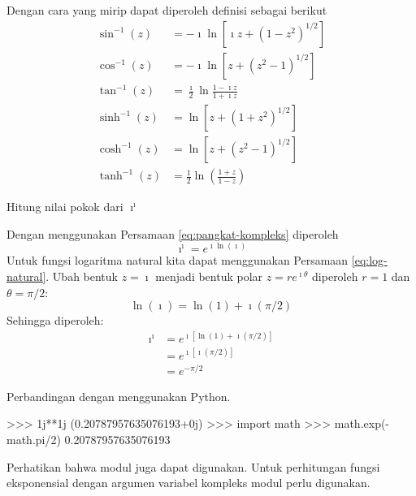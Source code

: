 Dengan cara yang mirip dapat diperoleh definisi sebagai berikut
\begin{align*}
\sin^{-1}(z) & = -\imath \ln\left[\imath z+\left(1-z^{2}\right)^{1/2}\right] \\
\cos^{-1}(z) & = -\imath \ln\left[z+\left(z^{2}-1\right)^{1/2}\right] \\
\tan^{-1}(z) & = \frac{\imath }{2}\ln\frac{1-\imath z}{1+\imath z} \\
\sinh^{-1}(z) & = \ln\left[z + \left(1+z^{2} \right)^{1/2}\right] \\
\cosh^{-1}(z) & = \ln\left[z + \left(z^{2} - 1\right)^{1/2}\right] \\
\tanh^{-1}(z) & = \frac{1}{2} \ln\left( \frac{1+z}{1-z} \right)
\end{align*}




\begin{contoh}
Hitung nilai pokok dari $\imath^{\imath}$

Dengan menggunakan Persamaan \eqref{eq:pangkat-kompleks} diperoleh
\begin{equation*}
\imath^{\imath} = e^{\imath \ln(\imath)}
\end{equation*}
Untuk fungsi logaritma natural kita dapat menggunakan Persamaan \ref{eq:log-natural}.
Ubah bentuk $z=\imath$ menjadi bentuk polar $z = r e^{\imath \theta}$ diperoleh
$r = 1$ dan $\theta = \pi/2$:
\begin{equation*}
\ln(\imath) = \ln(1) + \imath (\pi/2)
\end{equation*}
Sehingga diperoleh:
\begin{align*}
\imath^{\imath} & = e^{\imath\left[ \ln(1) + \imath (\pi/2) \right]} \\
& = e^{\imath\left[ \imath (\pi/2) \right]} \\
& = e^{-\pi/2}
\end{align*}

Perbandingan dengan menggunakan Python.
\begin{pyconcode}
>>> 1j**1j
(0.20787957635076193+0j)
>>> import math
>>> math.exp(-math.pi/2)
0.20787957635076193
\end{pyconcode}
Perhatikan bahwa modul  juga dapat digunakan. Untuk perhitungan
fungsi eksponensial dengan argumen variabel kompleks modul 
perlu digunakan.
\end{contoh}


